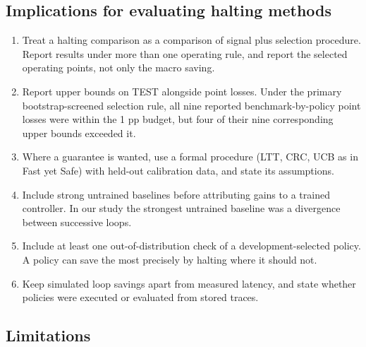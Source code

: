 \subsection{Implications for evaluating halting methods}

\begin{enumerate}
\def\labelenumi{\arabic{enumi}.}
\tightlist
\item
  Treat a halting comparison as a comparison of signal plus selection procedure. Report results under more than one operating rule, and report
  the selected operating points, not only the macro saving.
\item
  Report upper bounds on TEST alongside point losses. Under the primary bootstrap-screened selection rule, all nine reported benchmark-by-policy point losses were within the 1 pp budget, but four of their nine corresponding upper bounds exceeded it.
\item
  Where a guarantee is wanted, use a formal procedure (LTT, CRC, UCB as in Fast yet Safe) with held-out calibration data, and state its assumptions.
\item
  Include strong untrained baselines before attributing gains to a trained controller. In our study the strongest untrained baseline was a divergence between successive loops.
\item
  Include at least one out-of-distribution check of a development-selected policy. A policy can save the most precisely by halting where it should not.
\item
  Keep simulated loop savings apart from measured latency, and state whether policies were executed or evaluated from stored traces.
\end{enumerate}

\subsection{Limitations}

